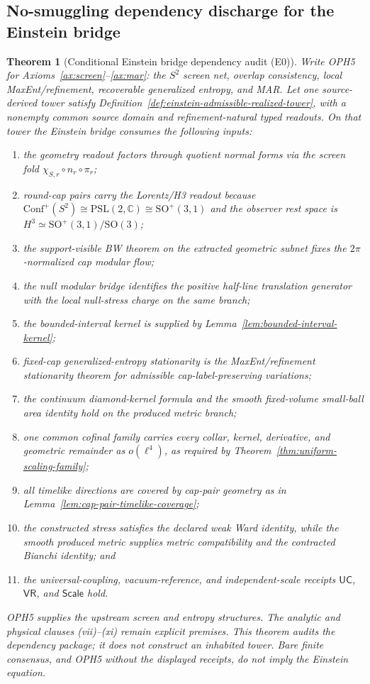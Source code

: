 \documentclass[11pt]{article}
\newtheorem{theorem}{Theorem}[section]
\begin{document}
\subsection{No-smuggling dependency discharge for the Einstein bridge}

\begin{theorem}[Conditional Einstein bridge dependency audit (E0)]\label{thm:einstein-bridge-discharge}
Write OPH5 for Axioms~\ref{ax:screen}--\ref{ax:mar}: the \(S^2\) screen net,
overlap consistency, local MaxEnt/refinement, recoverable generalized entropy,
and MAR. Let one source-derived tower satisfy
Definition~\ref{def:einstein-admissible-realized-tower}, with a nonempty
common source domain and refinement-natural typed readouts. On that tower the
Einstein bridge consumes the following inputs:
\begin{enumerate}[leftmargin=2em,label=(\roman*)]
\item the geometry readout factors through quotient normal forms via the
screen fold \(\chi_{S,r}\circ n_r\circ\pi_r\);
\item round-cap pairs carry the Lorentz/H3 readout because
\(\mathrm{Conf}^+(S^2)\cong \mathrm{PSL}(2,\mathbb C)\cong
\mathrm{SO}^+(3,1)\) and the observer rest space is
\(H^3\simeq\mathrm{SO}^+(3,1)/\mathrm{SO}(3)\);
\item the support-visible BW theorem on the extracted geometric subnet
fixes the \(2\pi\)-normalized cap modular flow;
\item the null modular bridge identifies the positive half-line translation
generator with the local null-stress charge on the same branch;
\item the bounded-interval kernel is supplied by
Lemma~\ref{lem:bounded-interval-kernel};
\item fixed-cap generalized-entropy stationarity is the MaxEnt/refinement
stationarity theorem for admissible cap-label-preserving variations;
\item the continuum diamond-kernel formula and the smooth fixed-volume
small-ball area identity hold on the produced metric branch;
\item one common cofinal family carries every collar, kernel, derivative, and
geometric remainder as \(o(\ell^4)\), as required by
Theorem~\ref{thm:uniform-scaling-family};
\item all timelike directions are covered by cap-pair geometry as in
Lemma~\ref{lem:cap-pair-timelike-coverage};
\item the constructed stress satisfies the declared weak Ward identity, while
the smooth produced metric supplies metric compatibility and the contracted
Bianchi identity; and
\item the universal-coupling, vacuum-reference, and independent-scale
receipts \(\mathsf{UC}\), \(\mathsf{VR}\), and \(\mathsf{Scale}\) hold.
\end{enumerate}
OPH5 supplies the upstream screen and entropy structures. The analytic and
physical clauses (vii)--(xi) remain explicit premises. This theorem audits the
dependency package; it does not construct an inhabited tower. Bare finite
consensus, and OPH5 without the displayed receipts, do not imply the Einstein
equation.
\end{theorem}
\end{document}
